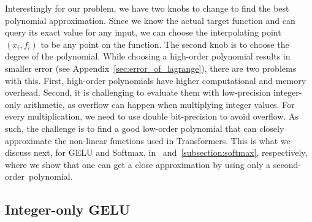 Interestingly for our problem, we have two knobs to change to find the best polynomial approximation.
Since we know the actual target function and can query its exact value
for any input,
we can choose the interpolating point $(x_i, f_i)$ to be any point on the function.
The second knob is to choose the degree of the polynomial.
While choosing a high-order polynomial results in smaller error (see Appendix~\ref{sec:error_of_lagrange}), there are two problems with this.
First, high-order polynomials have higher computational and memory overhead.
Second, it is challenging to evaluate
them with low-precision integer-only arithmetic,
as overflow can happen when multiplying integer values. For every multiplication, we need
to use double bit-precision to avoid overflow.
As such, the challenge is to find a good low-order polynomial that can closely approximate the
non-linear functions used in Transformers. 
This is what we discuss next, for GELU and Softmax, in~ and~\ref{subsection:softmax}, respectively, where we show that one can
get a close approximation by using only a second-order~polynomial.




\subsection{\textbf{Integer-only GELU}}
\label{subsection:gelu}


